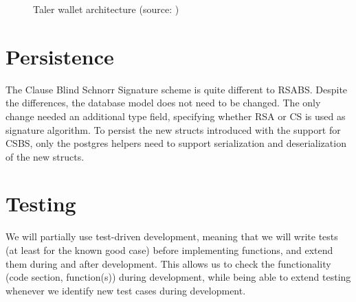 \begin{figure}[h!]
  \begin{center}
  \end{center}
  \caption{Taler wallet architecture (source: \cite{taler-presentation})}
  \label{fig:taler:wallet-architecture}
\end{figure}

\section{Persistence}
The Clause Blind Schnorr Signature scheme is quite different to \gls{RSABS}.
Despite the differences, the database model does not need to be changed.
The only change needed an additional type field, specifying whether RSA or CS is used as signature algorithm.
To persist the new structs introduced with the support for \gls{CSBS}, only the postgres helpers need to support serialization and deserialization of the new structs.

\section{Testing}
We will partially use test-driven development, meaning that we will write tests (at least for the known good case) before implementing functions, and extend them during and after development.
This allows us to check the functionality (code section, function(s)) during development, while being able to extend testing whenever we identify new test cases during development.

